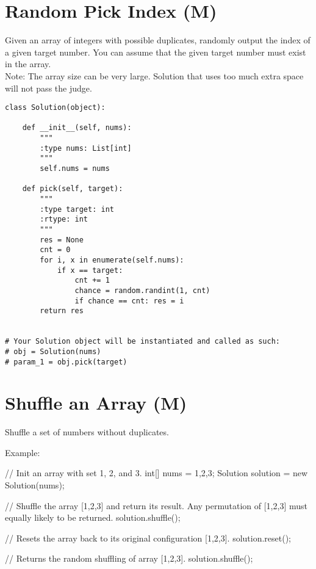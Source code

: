 \section{Random Pick Index (M)}
Given an array of integers with possible duplicates, randomly output the index of a given target number. You can assume that the given target number must exist in the array.\\

Note:
The array size can be very large. Solution that uses too much extra space will not pass the judge.

\begin{lstlisting}
class Solution(object):

    def __init__(self, nums):
        """
        :type nums: List[int]
        """
        self.nums = nums

    def pick(self, target):
        """
        :type target: int
        :rtype: int
        """
        res = None
        cnt = 0
        for i, x in enumerate(self.nums):
            if x == target:
                cnt += 1
                chance = random.randint(1, cnt)
                if chance == cnt: res = i
        return res


# Your Solution object will be instantiated and called as such:
# obj = Solution(nums)
# param_1 = obj.pick(target)
\end{lstlisting}

\section{Shuffle an Array (M)}
Shuffle a set of numbers without duplicates.

Example:

// Init an array with set 1, 2, and 3.
int[] nums = {1,2,3};
Solution solution = new Solution(nums);

// Shuffle the array [1,2,3] and return its result. Any permutation of [1,2,3] must equally likely to be returned.
solution.shuffle();

// Resets the array back to its original configuration [1,2,3].
solution.reset();

// Returns the random shuffling of array [1,2,3].
solution.shuffle();

